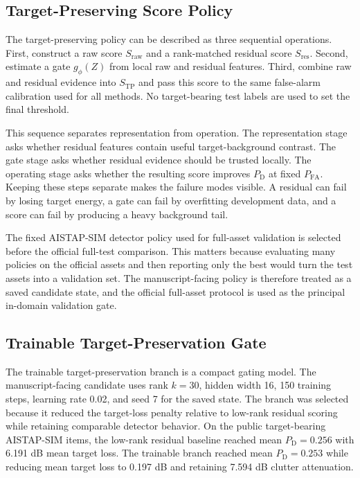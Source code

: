 \documentclass[journal]{IEEEtran}
\begin{document}
\subsection{Target-Preserving Score Policy}

The target-preserving policy can be described as three sequential operations. First, construct a raw score $S_{\mathrm{raw}}$ and a rank-matched residual score $S_{\mathrm{res}}$. Second, estimate a gate $g_\phi(Z)$ from local raw and residual features. Third, combine raw and residual evidence into $S_{\mathrm{TP}}$ and pass this score to the same false-alarm calibration used for all methods. No target-bearing test labels are used to set the final threshold.

This sequence separates representation from operation. The representation stage asks whether residual features contain useful target-background contrast. The gate stage asks whether residual evidence should be trusted locally. The operating stage asks whether the resulting score improves $P_{\mathrm{D}}$ at fixed $P_{\mathrm{FA}}$. Keeping these steps separate makes the failure modes visible. A residual can fail by losing target energy, a gate can fail by overfitting development data, and a score can fail by producing a heavy background tail.

The fixed AISTAP-SIM detector policy used for full-asset validation is selected before the official full-test comparison. This matters because evaluating many policies on the official assets and then reporting only the best would turn the test assets into a validation set. The manuscript-facing policy is therefore treated as a saved candidate state, and the official full-asset protocol is used as the principal in-domain validation gate.

\subsection{Trainable Target-Preservation Gate}

The trainable target-preservation branch is a compact gating model. The manuscript-facing candidate uses rank $k=30$, hidden width 16, 150 training steps, learning rate 0.02, and seed 7 for the saved state. The branch was selected because it reduced the target-loss penalty relative to low-rank residual scoring while retaining comparable detector behavior. On the public target-bearing AISTAP-SIM items, the low-rank residual baseline reached mean $P_{\mathrm{D}}=0.256$ with 6.191 dB mean target loss. The trainable branch reached mean $P_{\mathrm{D}}=0.253$ while reducing mean target loss to 0.197 dB and retaining 7.594 dB clutter attenuation.
\end{document}
